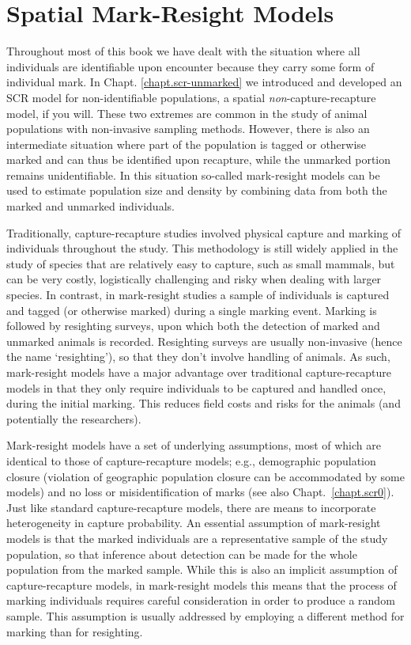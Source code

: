 \chapter{
Spatial Mark-Resight Models
}

\label{chapt.partialID}

\vspace{.3in}


Throughout most of this book we have dealt with the situation where
all individuals are identifiable upon encounter because they
carry some form of individual mark. In Chapt. \ref{chapt.scr-unmarked}
we introduced and developed an SCR model for non-identifiable
populations, a spatial {\it non}-capture-recapture model, if you will.
These two extremes are common in the study of animal populations with
non-invasive sampling methods. However, there is also an intermediate
situation where part of the population is tagged or otherwise marked
and can thus be identified upon recapture, while the unmarked portion
remains unidentifiable.  In this situation so-called mark-resight
models \citep{bartmann_etal:1987, arnason_etal:1991, neal_etal:1993}
can be used to estimate population size and density by combining data
from both the marked and unmarked individuals.

Traditionally, capture-recapture studies involved physical capture and
marking of individuals throughout the study.  This methodology is
still widely applied in the study of species that are relatively easy
to capture, such as small mammals, but can be very costly,
logistically challenging and risky when dealing with larger
species. In contrast, in mark-resight studies a sample of individuals
is captured and tagged (or otherwise marked) during a single marking
event. Marking is followed by resighting surveys, upon which both the
detection of marked 
and unmarked animals
is recorded. Resighting surveys are usually non-invasive (hence the
name `resighting'), so that they don't involve handling of animals. As
such, mark-resight models have a major advantage over traditional
capture-recapture models in that they only require individuals to be
captured and handled once, during the initial marking. This reduces
field costs and risks for the animals (and potentially the
researchers).

Mark-resight models have a set of underlying assumptions, most of
which are identical to those of capture-recapture models; e.g.,
demographic population closure (violation of geographic population
closure can be accommodated by some models) and no loss or
misidentification of marks (see also Chapt.~\ref{chapt.scr0}).  Just
like standard capture-recapture models, there are means to incorporate
heterogeneity in capture probability. An essential assumption of
mark-resight models is that the marked individuals are a
representative sample of the study population, so that inference about
detection can be made for the whole population from the marked
sample. While this is also an implicit assumption of capture-recapture
models, in mark-resight models this means that the process of marking
individuals requires careful consideration in order to produce a
random sample.  This assumption is usually addressed by employing a
different method for marking than for resighting.


